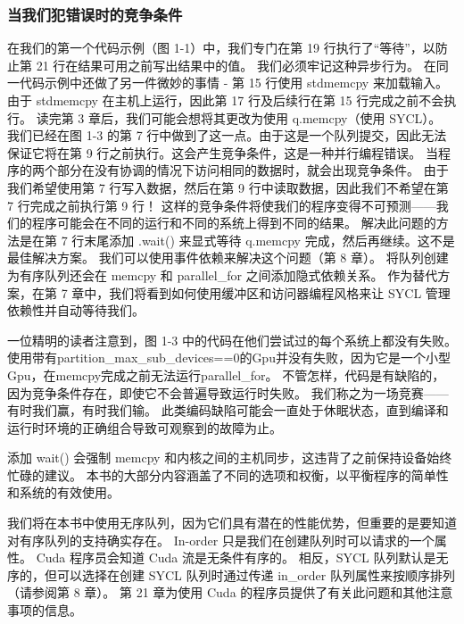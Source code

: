 \subsubsection{当我们犯错误时的竞争条件}
在我们的第一个代码示例（图 1-1）中，我们专门在第 19 行执行了“等待”，以防止第 21 行在结果可用之前写出结果中的值。 我们必须牢记这种异步行为。 在同一代码示例中还做了另一件微妙的事情 - 第 15 行使用 std\:\:memcpy 来加载输入。 由于 std\:\:memcpy 在主机上运行，因此第 17 行及后续行在第 15 行完成之前不会执行。 读完第 3 章后，我们可能会想将其更改为使用 q.memcpy（使用 SYCL）。 我们已经在图 1-3 的第 7 行中做到了这一点。由于这是一个队列提交，因此无法保证它将在第 9 行之前执行。这会产生竞争条件，这是一种并行编程错误。 当程序的两个部分在没有协调的情况下访问相同的数据时，就会出现竞争条件。 由于我们希望使用第 7 行写入数据，然后在第 9 行中读取数据，因此我们不希望在第 7 行完成之前执行第 9 行！ 这样的竞争条件将使我们的程序变得不可预测——我们的程序可能会在不同的运行和不同的系统上得到不同的结果。 解决此问题的方法是在第 7 行末尾添加 .wait() 来显式等待 q.memcpy 完成，然后再继续。这不是最佳解决方案。 我们可以使用事件依赖来解决这个问题（第 8 章）。 将队列创建为有序队列还会在 memcpy 和 parallel\_for 之间添加隐式依赖关系。 作为替代方案，在第 7 章中，我们将看到如何使用缓冲区和访问器编程风格来让 SYCL 管理依赖性并自动等待我们。

\begin{remark}[竞争条件并不总是导致程序失败]
	一位精明的读者注意到，图 1-3 中的代码在他们尝试过的每个系统上都没有失败。 使用带有partition\_max\_sub\_devices==0的Gpu并没有失败，因为它是一个小型Gpu，在memcpy完成之前无法运行parallel\_for。 不管怎样，代码是有缺陷的，因为竞争条件存在，即使它不会普遍导致运行时失败。 我们称之为一场竞赛——有时我们赢，有时我们输。 此类编码缺陷可能会一直处于休眠状态，直到编译和运行时环境的正确组合导致可观察到的故障为止。
\end{remark}

添加 wait() 会强制 memcpy 和内核之间的主机同步，这违背了之前保持设备始终忙碌的建议。 本书的大部分内容涵盖了不同的选项和权衡，以平衡程序的简单性和系统的有效使用。

\begin{remark}
	我们将在本书中使用无序队列，因为它们具有潜在的性能优势，但重要的是要知道对有序队列的支持确实存在。 In-order 只是我们在创建队列时可以请求的一个属性。 Cuda 程序员会知道 Cuda 流是无条件有序的。 相反，SYCL 队列默认是无序的，但可以选择在创建 SYCL 队列时通过传递 in\_order 队列属性来按顺序排列（请参阅第 8 章）。 第 21 章为使用 Cuda 的程序员提供了有关此问题和其他注意事项的信息。
\end{remark}

